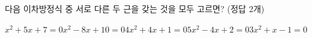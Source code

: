 다음 이차방정식 중 서로 다른 두 근을 갖는 것을 모두 고르면? (정답 2개)
\begin{choicesii}{$x^2+5x+7=0$}{$x^2-8x+10=0$}{$4x^2+4x+1=0$}{$5x^2-4x+2=0$}{$3x^2+x-1=0$}\end{choicesii}
